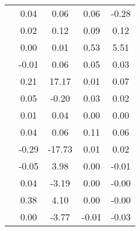 \begin{table}
\begin{tabular}{c|cc|cc|}
\multicolumn{1}{|c|}{} & \multicolumn{1}{|c|}{      0.04} & \multicolumn{1}{|c|}{      0.06} & \multicolumn{1}{|c|}{      0.06} & \multicolumn{1}{|c|}{     -0.28} \\ 
\multicolumn{1}{|c|}{} & \multicolumn{1}{|c|}{      0.02} & \multicolumn{1}{|c|}{      0.12} & \multicolumn{1}{|c|}{      0.09} & \multicolumn{1}{|c|}{      0.12} \\ 
\multicolumn{1}{|c|}{} & \multicolumn{1}{|c|}{      0.00} & \multicolumn{1}{|c|}{      0.01} & \multicolumn{1}{|c|}{      0.53} & \multicolumn{1}{|c|}{      5.51} \\ 
\multicolumn{1}{|c|}{} & \multicolumn{1}{|c|}{     -0.01} & \multicolumn{1}{|c|}{      0.06} & \multicolumn{1}{|c|}{      0.05} & \multicolumn{1}{|c|}{      0.03} \\ 
\multicolumn{1}{|c|}{} & \multicolumn{1}{|c|}{      0.21} & \multicolumn{1}{|c|}{     17.17} & \multicolumn{1}{|c|}{      0.01} & \multicolumn{1}{|c|}{      0.07} \\ 
\multicolumn{1}{|c|}{} & \multicolumn{1}{|c|}{      0.05} & \multicolumn{1}{|c|}{     -0.20} & \multicolumn{1}{|c|}{      0.03} & \multicolumn{1}{|c|}{      0.02} \\ 
\multicolumn{1}{|c|}{} & \multicolumn{1}{|c|}{      0.01} & \multicolumn{1}{|c|}{      0.04} & \multicolumn{1}{|c|}{      0.00} & \multicolumn{1}{|c|}{      0.00} \\ 
\multicolumn{1}{|c|}{} & \multicolumn{1}{|c|}{      0.04} & \multicolumn{1}{|c|}{      0.06} & \multicolumn{1}{|c|}{      0.11} & \multicolumn{1}{|c|}{      0.06} \\ 
\multicolumn{1}{|c|}{} & \multicolumn{1}{|c|}{     -0.29} & \multicolumn{1}{|c|}{    -17.73} & \multicolumn{1}{|c|}{      0.01} & \multicolumn{1}{|c|}{      0.02} \\ 
\multicolumn{1}{|c|}{} & \multicolumn{1}{|c|}{     -0.05} & \multicolumn{1}{|c|}{      3.98} & \multicolumn{1}{|c|}{      0.00} & \multicolumn{1}{|c|}{     -0.01} \\ 
\multicolumn{1}{|c|}{} & \multicolumn{1}{|c|}{      0.04} & \multicolumn{1}{|c|}{     -3.19} & \multicolumn{1}{|c|}{      0.00} & \multicolumn{1}{|c|}{     -0.00} \\ 
\multicolumn{1}{|c|}{} & \multicolumn{1}{|c|}{      0.38} & \multicolumn{1}{|c|}{      4.10} & \multicolumn{1}{|c|}{      0.00} & \multicolumn{1}{|c|}{     -0.00} \\ 
\multicolumn{1}{|c|}{} & \multicolumn{1}{|c|}{      0.00} & \multicolumn{1}{|c|}{     -3.77} & \multicolumn{1}{|c|}{     -0.01} & \multicolumn{1}{|c|}{     -0.03} \\ 

\end{tabular}
\end{table}
